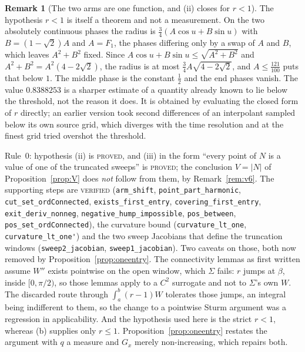 \documentclass[11pt]{article}
\theoremstyle{definition}
\newtheorem{remark}[theorem]{Remark}
\newcommand{\Sig}{\Sigma}
\begin{document}
\begin{remark}[The two arms are one function, and (ii) closes for $r<1$]
The hypothesis $r<1$ is itself a theorem and not a measurement. On the two absolutely
continuous phases the radius is $\tfrac34(A\cos u+B\sin u)$ with $B=(1-\sqrt2)A$ and
$A=F_1$, the phases differing only by a swap of $A$ and $B$, which leaves $A^2+B^2$ fixed.
Since $A\cos u+B\sin u\le\sqrt{A^2+B^2}$ and $A^2+B^2=A^2(4-2\sqrt2)$, the radius is at most
$\tfrac34 A\sqrt{4-2\sqrt2}$, and $A\le\tfrac{121}{100}$ puts that below $1$. The middle
phase is the constant $\tfrac12$ and the end phases vanish. The value $0.8388253$ is a
sharper estimate of a quantity already known to lie below the threshold, not the reason it
does. It is obtained by evaluating the closed form of $r$ directly; an earlier version took
second differences of an interpolant sampled below its own source grid, which diverges with
the time resolution and at the finest grid tried overshot the threshold.

Rule~0: hypothesis (ii) is \textsc{proved}, and (iii) in the form ``every point of $N$ is a
value of one of the truncated sweeps'' is \textsc{proved}; the conclusion $V=|N|$ of
Proposition~\ref{prop:V} does \emph{not} follow from them, by Remark~\ref{rem:v6}. The
supporting steps are \textsc{verified}
(\verb|arm_shift|, \verb|point_part_harmonic|, \verb|cut_set_ordConnected|,
\verb|exists_first_entry|, \verb|covering_first_entry|, \verb|exit_deriv_nonneg|,
\verb|negative_hump_impossible|, \verb|pos_between|, \verb|pos_set_ordConnected|), the
curvature bound (\verb|curvature_lt_one|, \verb|curvature_lt_one'|) and the two sweep
Jacobians that define the truncation windows (\verb|sweep2_jacobian|,
\verb|sweep1_jacobian|). Two caveats on those, both now removed by
Proposition~\ref{prop:oneentry}. The connectivity lemmas as first written assume $W''$ exists
pointwise on the open window, which $\Sig$ fails: $r$ jumps at $\beta$, inside $[0,\pi/2)$,
so those lemmas apply to a $C^2$ surrogate and not to $\Sig$'s own $W$. The discarded route
through $\int_a^b(r-1)W$ tolerates those jumps, an integral being indifferent to them, so
the change to a pointwise Sturm argument was a regression in applicability. And the
hypothesis used here is the strict $r<1$, whereas (b) supplies only $r\le1$.
Proposition~\ref{prop:oneentry} restates the argument with $q$ a measure and $G_x$ merely
non-increasing, which repairs both.
\end{remark}
\end{document}
